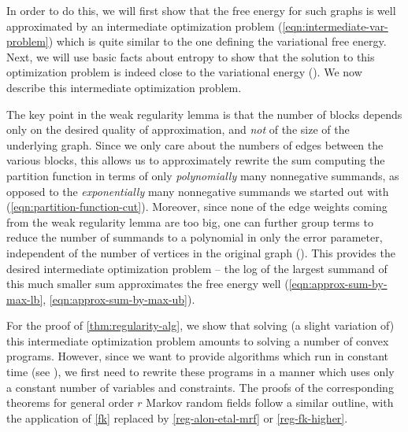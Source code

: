 \documentclass[final, 12pt]{colt2018}
\theoremstyle{definition}
\theoremstyle{plain}
\begin{document}
In order to do this, we will first show that the free energy for such graphs is well approximated by an intermediate optimization problem (\cref{eqn:intermediate-var-problem}) which is quite similar to the one defining the variational free energy. Next, we will use basic facts about entropy to show that the solution to this optimization problem is indeed close to the variational energy (). We now describe this intermediate optimization problem. 

The key point in the weak regularity lemma is that the number of blocks depends only on the desired quality of approximation, and \emph{not} of the size of the underlying graph. Since we only care about the numbers of edges between the various blocks, this allows us to approximately rewrite the sum computing the partition function in terms of only \emph{polynomially} many nonnegative summands, as opposed to the \emph{exponentially} many nonnegative summands we started out with (\cref{eqn:partition-function-cut}). Moreover, since none of the edge weights coming from the weak regularity lemma are too big, one can further group terms to reduce the number of summands to a polynomial in only the error parameter, independent of the number of vertices in the original graph (). This provides the desired intermediate optimization problem -- the log of the largest summand of this much smaller sum approximates the free energy  well (\cref{eqn:approx-sum-by-max-lb}, \cref{eqn:approx-sum-by-max-ub}). 

For the proof of \cref{thm:regularity-alg}, we show that solving (a slight variation of) this intermediate optimization problem amounts to solving a number of convex programs. However, since we want to provide algorithms which run in constant time (see ), we first need to rewrite these programs in a manner which uses only a constant number of variables and constraints. The proofs of the corresponding theorems for general order $r$ Markov random fields follow a similar outline, with the application of \cref{fk} replaced by \cref{reg-alon-etal-mrf} or \cref{reg-fk-higher}.   
\end{document}
